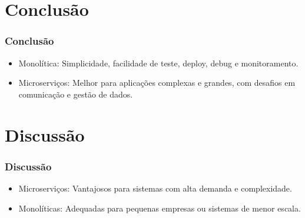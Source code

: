 \documentclass{beamer}
\begin{document}
\section{Conclusão}

\begin{frame}
\frametitle{Conclusão}
\begin{itemize}
    \item Monolítica: Simplicidade, facilidade de teste, deploy, debug e monitoramento.
    \item Microserviços: Melhor para aplicações complexas e grandes, com desafios em comunicação e gestão de dados.
\end{itemize}
\end{frame}

\section{Discussão}

\begin{frame}
\frametitle{Discussão}
\begin{itemize}
    \item Microserviços: Vantajosos para sistemas com alta demanda e complexidade.
    \item Monolíticas: Adequadas para pequenas empresas ou sistemas de menor escala.
\end{itemize}
\end{frame}
\end{document}
